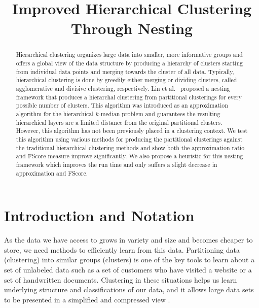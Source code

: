 \documentclass[conference, 10pt, final]{IEEEtran}
\begin{document}
 

\title{Improved Hierarchical Clustering Through Nesting}


\author{
}


\maketitle

\begin{abstract}
Hierarchical clustering organizes large data into smaller, more informative groups and offers a global view of the data structure by producing a hierarchy of clusters starting from individual data points and merging towards the cluster of all data. Typically, hierarchical clustering is done by greedily either merging or dividing clusters, called agglomerative and divisive clustering, respectively. Lin et al.~\cite{Lin} proposed a nesting framework that produces a hierarchal clustering from partitional clusterings for every possible number of clusters. This algorithm was introduced as an approximation algorithm for the hierarchical $k$-median problem and guarantees the resulting hierarchical layers are a limited distance from the original partitional clusters. However, this algorithm has not been previously placed in a clustering context. We test this algorithm using various methods for producing the partitional clusterings against the traditional hierarchical clustering methods and show both the approximation ratio and FScore measure improve significantly. We also propose a heuristic for this nesting framework which improves the run time and only suffers a slight decrease in approximation and FScore.
\end{abstract}


\section{Introduction and Notation}
As the data we have access to grows in variety and size and becomes cheaper to store, we need methods to efficiently learn from this data. 
Partitioning data (clustering) into similar groups (clusters) is one of the key tools to learn about a set of unlabeled data such as a set of customers who have visited a website or a set of handwritten documents.
Clustering in these situations helps us learn underlying structure and classifications of our data, and it allows large data sets to be presented in a simplified and compressed view \cite{Jain}.
\end{document}

